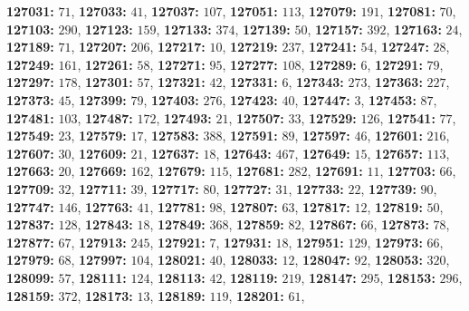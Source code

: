 \textsf{\bfseries 127031:} $71$, \textsf{\bfseries 127033:} $41$, \textsf{\bfseries 127037:} $107$, \textsf{\bfseries 127051:} $113$, \textsf{\bfseries 127079:} $191$, \textsf{\bfseries 127081:} $70$, \textsf{\bfseries 127103:} $290$, \textsf{\bfseries 127123:} $159$, \textsf{\bfseries 127133:} $374$, \textsf{\bfseries 127139:} $50$, \textsf{\bfseries 127157:} $392$, \textsf{\bfseries 127163:} $24$, \textsf{\bfseries 127189:} $71$, \textsf{\bfseries 127207:} $206$, \textsf{\bfseries 127217:} $10$, \textsf{\bfseries 127219:} $237$, \textsf{\bfseries 127241:} $54$, \textsf{\bfseries 127247:} $28$, \textsf{\bfseries 127249:} $161$, \textsf{\bfseries 127261:} $58$, \textsf{\bfseries 127271:} $95$, \textsf{\bfseries 127277:} $108$, \textsf{\bfseries 127289:} $6$, \textsf{\bfseries 127291:} $79$, \textsf{\bfseries 127297:} $178$, \textsf{\bfseries 127301:} $57$, \textsf{\bfseries 127321:} $42$, \textsf{\bfseries 127331:} $6$, \textsf{\bfseries 127343:} $273$, \textsf{\bfseries 127363:} $227$, \textsf{\bfseries 127373:} $45$, \textsf{\bfseries 127399:} $79$, \textsf{\bfseries 127403:} $276$, \textsf{\bfseries 127423:} $40$, \textsf{\bfseries 127447:} $3$, \textsf{\bfseries 127453:} $87$, \textsf{\bfseries 127481:} $103$, \textsf{\bfseries 127487:} $172$, \textsf{\bfseries 127493:} $21$, \textsf{\bfseries 127507:} $33$, \textsf{\bfseries 127529:} $126$, \textsf{\bfseries 127541:} $77$, \textsf{\bfseries 127549:} $23$, \textsf{\bfseries 127579:} $17$, \textsf{\bfseries 127583:} $388$, \textsf{\bfseries 127591:} $89$, \textsf{\bfseries 127597:} $46$, \textsf{\bfseries 127601:} $216$, \textsf{\bfseries 127607:} $30$, \textsf{\bfseries 127609:} $21$, \textsf{\bfseries 127637:} $18$, \textsf{\bfseries 127643:} $467$, \textsf{\bfseries 127649:} $15$, \textsf{\bfseries 127657:} $113$, \textsf{\bfseries 127663:} $20$, \textsf{\bfseries 127669:} $162$, \textsf{\bfseries 127679:} $115$, \textsf{\bfseries 127681:} $282$, \textsf{\bfseries 127691:} $11$, \textsf{\bfseries 127703:} $66$, \textsf{\bfseries 127709:} $32$, \textsf{\bfseries 127711:} $39$, \textsf{\bfseries 127717:} $80$, \textsf{\bfseries 127727:} $31$, \textsf{\bfseries 127733:} $22$, \textsf{\bfseries 127739:} $90$, \textsf{\bfseries 127747:} $146$, \textsf{\bfseries 127763:} $41$, \textsf{\bfseries 127781:} $98$, \textsf{\bfseries 127807:} $63$, \textsf{\bfseries 127817:} $12$, \textsf{\bfseries 127819:} $50$, \textsf{\bfseries 127837:} $128$, \textsf{\bfseries 127843:} $18$, \textsf{\bfseries 127849:} $368$, \textsf{\bfseries 127859:} $82$, \textsf{\bfseries 127867:} $66$, \textsf{\bfseries 127873:} $78$, \textsf{\bfseries 127877:} $67$, \textsf{\bfseries 127913:} $245$, \textsf{\bfseries 127921:} $7$, \textsf{\bfseries 127931:} $18$, \textsf{\bfseries 127951:} $129$, \textsf{\bfseries 127973:} $66$, \textsf{\bfseries 127979:} $68$, \textsf{\bfseries 127997:} $104$, \textsf{\bfseries 128021:} $40$, \textsf{\bfseries 128033:} $12$, \textsf{\bfseries 128047:} $92$, \textsf{\bfseries 128053:} $320$, \textsf{\bfseries 128099:} $57$, \textsf{\bfseries 128111:} $124$, \textsf{\bfseries 128113:} $42$, \textsf{\bfseries 128119:} $219$, \textsf{\bfseries 128147:} $295$, \textsf{\bfseries 128153:} $296$, \textsf{\bfseries 128159:} $372$, \textsf{\bfseries 128173:} $13$, \textsf{\bfseries 128189:} $119$, \textsf{\bfseries 128201:} $61$, 
